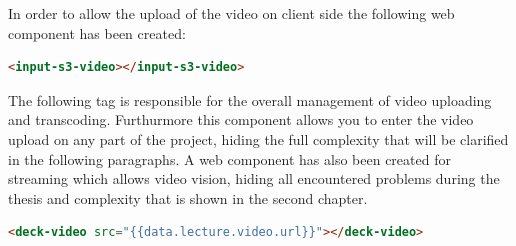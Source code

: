In order to allow the upload of the video on client side the following web component has been created:

\begin{lstlisting}[language=html]
      <input-s3-video></input-s3-video>
\end{lstlisting}

The following tag is responsible for the overall management of video uploading and transcoding. Furthurmore this component allows you to enter the video upload on any part of the project, hiding the full complexity that will be clarified in the following paragraphs.
A web component has also been created for streaming which allows video vision, hiding all encountered problems during the thesis and complexity that is shown in the second chapter.

\begin{lstlisting}[language=html]
       <deck-video src="{{data.lecture.video.url}}"></deck-video>
\end{lstlisting}